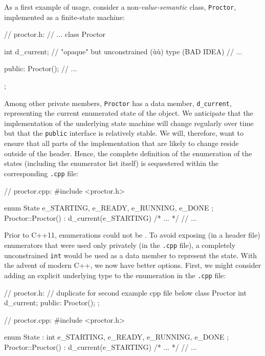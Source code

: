 As a first example of  usage, consider a
non-\emph{value-semantic}  class, \lstinline!Proctor!,
implemented as a finite-state machine:

\begin{emcppslisting}[emcppsbatch=e2]
// proctor.h:
// ...
class Proctor
{
    int d_current;  // "opaque" but unconstrained (ù{}ù) type (BAD IDEA)
    // ...

public:
    Proctor();
    // ...
};
\end{emcppslisting}

\noindent Among other private members, \lstinline!Proctor! has a data member,
\lstinline!d_current!, representing the current enumerated state of
the object. We anticipate that the implementation of the underlying
state machine will change regularly over time but that the
\lstinline!public! interface is relatively stable. We will, therefore, want
to ensure that all parts of the implementation that are likely to change
reside outside of the header. Hence, the complete definition of the
enumeration of the states (including the enumerator list itself) is
sequestered within the corresponding \lstinline!.cpp! file:

\begin{emcppslisting}[emcppsbatch=e2]
// proctor.cpp:
#include <proctor.h>

enum State { e_STARTING, e_READY, e_RUNNING, e_DONE };
Proctor::Proctor() : d_current(e_STARTING) { /* ... */ }
// ...
\end{emcppslisting}

\noindent Prior to C++11, enumerations could not be . To
avoid exposing (in a header file) enumerators that were used only
privately (in the \lstinline!.cpp! file), a completely unconstrained
\lstinline!int! would be used as a data member to represent the state. With
the advent of modern C++, we now have better options. First, we might
consider adding an explicit underlying type to the enumeration in the
\lstinline!.cpp! file:

\begin{emcppshiddenlisting}[emcppsbatch=e3]
// proctor.h:
// duplicate for second example cpp file below
class Proctor
{
    int d_current;
public:
    Proctor();
};
\end{emcppshiddenlisting}
\begin{emcppslisting}[emcppsbatch=e3]
// proctor.cpp:
#include <proctor.h>

enum State : int { e_STARTING, e_READY, e_RUNNING, e_DONE };
Proctor::Proctor() : d_current(e_STARTING) { /* ... */ }
// ...
\end{emcppslisting}

